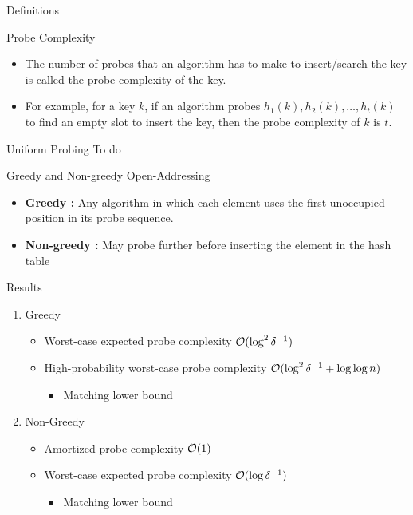 \documentclass{beamer}
\begin{document}
\begin{frame} {Definitions}
	\begin{block}{Probe Complexity}
		\begin{itemize}
			\item The number of probes that an algorithm has to make to insert/search the key is called the probe complexity of the key.
			\item For example, for a key $k$, if an algorithm probes $h_1(k), h_2(k), \ldots, h_t(k)$ to find an empty slot to insert the key, then the probe complexity of $k$ is $t$.
		\end{itemize}
	\end{block}

\begin{block}{Uniform Probing}
	To do
\end{block}
\end{frame}


\begin{frame}{Greedy and Non-greedy Open-Addressing}
	\begin{itemize}
		\item {\bf Greedy :}  Any algorithm in which each element uses the first unoccupied position in its probe sequence.
		\item {\bf Non-greedy :} May probe further before inserting the element in the hash table
	\end{itemize}
	
\end{frame}

\begin{frame}{Results}
	
	\begin{enumerate}
		\item Greedy
		\begin{itemize}
			\item Worst-case expected probe complexity ${\cal O}(\log^2{\delta^{-1}})$
			\item High-probability worst-case probe complexity ${\cal O}(\log^2{\delta^{-1}} + \log{\log{n}})$
			\begin{itemize}
				\item Matching lower bound
			\end{itemize}
		\end{itemize}
	\vspace{10mm}
	\item Non-Greedy 
	\begin{itemize}
		\item Amortized probe complexity ${\cal O}(1)$
		\item Worst-case expected probe complexity ${\cal O}(\log{\delta^{-1}})$
		\begin{itemize}
			\item Matching lower bound
		\end{itemize}
	\end{itemize}
	\end{enumerate}
\end{frame}
\end{document}
